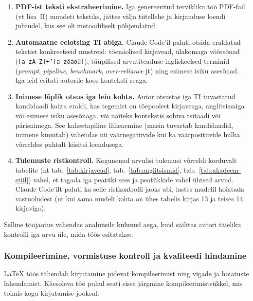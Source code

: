 \begin{enumerate}
    \item \textbf{PDF-ist teksti ekstraheerimine.} Iga genereeritud tervikliku töö PDF-fail (vt lisa~II) muudeti tekstiks, jättes välja tiitellehe ja kirjanduse loendi juhtudel, kus see oli metoodiliselt põhjendatud.
    \item \textbf{Automaatne eelotsing TI abiga.} Claude Code'il paluti otsida eraldatud tekstist konkreetseid mustreid: tõenäolised kirjavead, ülakomaga võõrsõnad (\texttt{[a-zA-Z]+'[a-zõäöü]}), tüüpilised arvutiteaduse ingliskeelsed terminid (\textit{prompt}, \textit{pipeline}, \textit{benchmark}, \textit{over-reliance} jt) ning esimese isiku asesõnad. Iga leid esitati autorile koos konteksti reaga.
    \item \textbf{Inimese lõplik otsus iga leiu kohta.} Autor otsustas iga TI tuvastatud kandidaadi kohta eraldi, kas tegemist on tõepoolest kirjaveaga, anglitsismiga või esimese isiku asesõnaga, või näiteks kontekstis sobiva tsitaadi või pärisnimega. See kaheetapiline lähenemine (masin tuvastab kandidaadid, inimene kinnitab) vähendas nii väärnegatiivide kui ka väärpositiivide hulka võrreldes puhtalt käsitsi loendusega.
    \item \textbf{Tulemuste ristkontroll.} Kogunenud arvulisi tulemusi võrreldi korduvalt tabelite (nt tab.~\ref{tab:kirjavead}, tab.~\ref{tab:anglitsismid}, tab.~\ref{tab:akadeem-stiil}) vahel, et tagada iga peatüki sees ja peatükkide vahel ühtsed arvud. Claude Code'ilt paluti ka selle ristkontrolli jaoks abi, lastes mudelil hoiatada vastuoludest (nt kui sama mudeli kohta on ühes tabelis kirjas 13 ja teises 14 kirjaviga).
\end{enumerate}

Selline tööjaotus vähendas analüüsile kulunud aega, kuid säilitas autori täieliku kontrolli iga arvu üle, mida töös esitatakse.

\subsubsection{Kompileerimine, vormistuse kontroll ja kvaliteedi hindamine}

\LaTeX{} töös tähendab kirjutamine pidevat kompileerimist ning vigade ja hoiatuste lahendamist. Käesoleva töö puhul seati sisse järgmine kompileerimistsükkel, mis toimis kogu kirjutamise jooksul.

